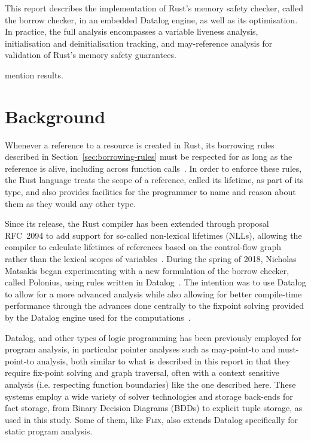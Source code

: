 \documentclass[11pt,a4paper,twoside,openany]{report}
\newcommand{\fixme}[1] {{\color{red}#1}}
\begin{document}
This report describes the implementation of Rust's memory safety checker, called
the borrow checker, in an embedded Datalog engine, as well as its optimisation.
In practice, the full analysis encompasses a variable liveness analysis,
initialisation and deinitialisation tracking, and may-reference analysis for
validation of Rust's memory safety guarantees.

\fixme{mention results.}

\chapter{Background}
Whenever a reference to a resource is created in Rust, its borrowing rules
described in Section~\ref{sec:borrowing-rules} must be respected for as long as
the reference is alive, including across function
calls~\cite{nichols_rust_nodate}. In order to enforce these rules, the Rust
language treats the scope of a reference, called its lifetime, as part of its
type, and also provides facilities for the programmer to name and reason about
them as they would any other type.


Since its release, the Rust compiler has been extended through proposal RFC~2094
to add support for so-called non-lexical lifetimes (NLLs), allowing the compiler
to calculate lifetimes of references based on the control-flow graph rather than
the lexical scopes of variables~\cite{noauthor_rfc_2019}. During the spring of
2018, Nicholas Matsakis began experimenting with a new formulation of the borrow
checker, called Polonius, using rules written in
Datalog~\cite{matsakis_alias-based_2018}. The intention was to use Datalog to
allow for a more advanced analysis while also allowing for better compile-time
performance through the advances done centrally to the fixpoint solving provided
by the Datalog engine used for the computations~\cite{datafrog}.

Datalog, and other types of logic programming has been previously employed for
program analysis, in particular pointer analyses such as may-point-to and
must-point-to analysis, both similar to what is described in this report in that
they require fix-point solving and graph traversal, often with a context
sensitive analysis (i.e. respecting function boundaries) like the
one described here\cite{Dawson:1996:PPA:231379.231399,
  Berndl:2003:PAU:780822.781144, hajiyev_codequest:_2005,
  Whaley:2004:CCP:996893.996859, lam_context-sensitive_2005,
  Benton:2007:ISD:1273920.1273923, Hardekopf:2007:AGF:1250734.1250767,
  Smaragdakis:2011:PYC:1926385.1926390, smaragdakis_using_2010,
  balatsouras_datalog_2017, Madsen:2016:DFD:2908080.2908096,
  Eichberg:2008:DCC:1368088.1368142}. These systems employ a wide variety of
solver technologies and storage back-ends for fact storage, from Binary
Decision Diagrams (BDDs) to explicit tuple storage, as used in this study. Some
of them, like \textsc{Flix}, also extends Datalog specifically for static
program analysis\cite{Madsen:2016:DFD:2908080.2908096}.
\end{document}
